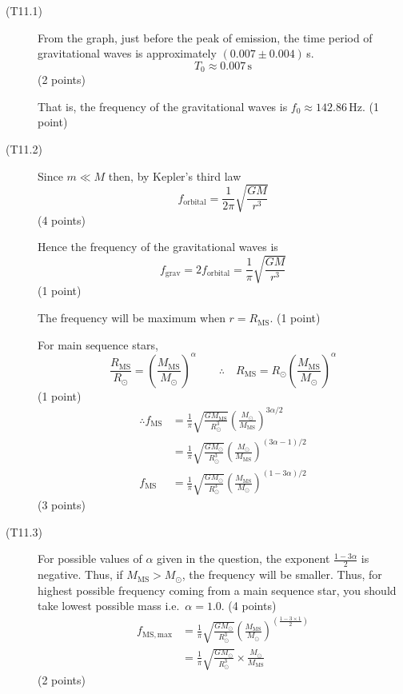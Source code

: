 \begin{description}
\item[(T11.1)] From the graph, just before the peak of emission, the time
  period of gravitational waves is approximately $(0.007 \pm 0.004)$\,s.
  \[ T_0 \approx 0.007\,\mathrm{s} \]
  \hfill(2 points)

  That is, the frequency of the gravitational waves is
  $f_0 \approx 142.86$\,Hz. \hfill(1 point)

\item[(T11.2)] Since $m \ll M$ then, by Kepler's third law
  \[ f_{\mathrm{orbital}} = \frac{1}{2\pi}\sqrt{\frac{GM}{r^3}} \]
  \hfill(4 points)

  Hence the frequency of the gravitational waves is
  \[ f_{\mathrm{grav}} = 2 f_{\mathrm{orbital}}
     = \frac{1}{\pi}\sqrt{\frac{GM}{r^3}} \]
  \hfill(1 point)

  The frequency will be maximum when $r = R_{\mathrm{MS}}$. \hfill(1 point)

  For main sequence stars,
  \[ \frac{R_{\mathrm{MS}}}{R_\odot}
     = \left(\frac{M_{\mathrm{MS}}}{M_\odot}\right)^{\alpha}
     \qquad\therefore\quad R_{\mathrm{MS}}
     = R_\odot \left(\frac{M_{\mathrm{MS}}}{M_\odot}\right)^{\alpha} \]
  \hfill(1 point)
  \begin{align*}
    \therefore f_{\mathrm{MS}}
      &= \frac{1}{\pi}\sqrt{\frac{G M_{\mathrm{MS}}}{R_\odot^3}}
         \left(\frac{M_\odot}{M_{\mathrm{MS}}}\right)^{3\alpha/2} \\
      &= \frac{1}{\pi}\sqrt{\frac{G M_\odot}{R_\odot^3}}
         \left(\frac{M_\odot}{M_{\mathrm{MS}}}\right)^{(3\alpha-1)/2} \\
    f_{\mathrm{MS}}
      &= \frac{1}{\pi}\sqrt{\frac{G M_\odot}{R_\odot^3}}
         \left(\frac{M_{\mathrm{MS}}}{M_\odot}\right)^{(1-3\alpha)/2}
  \end{align*}
  \hfill(3 points)

\item[(T11.3)] For possible values of $\alpha$ given in the question, the
  exponent $\frac{1-3\alpha}{2}$ is negative. Thus, if
  $M_{\mathrm{MS}} > M_\odot$, the frequency will be smaller. Thus, for highest
  possible frequency coming from a main sequence star, you should take lowest
  possible mass i.e.\ $\alpha = 1.0$. \hfill(4 points)
  \begin{align*}
    f_{\mathrm{MS,max}}
      &= \frac{1}{\pi}\sqrt{\frac{G M_\odot}{R_\odot^3}}
         \left(\frac{M_{\mathrm{MS}}}{M_\odot}\right)^{\left(\frac{1-3\times 1}{2}\right)} \\
      &= \frac{1}{\pi}\sqrt{\frac{G M_\odot}{R_\odot^3}}
         \times \frac{M_\odot}{M_{\mathrm{MS}}}
  \end{align*}
  \hfill(2 points)


\end{description}
